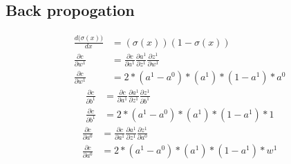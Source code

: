 \documentclass{article}
\begin{document}
\subsection{Back propogation}
\begin{align}
  \frac{d({\sigma(x))}}{dx} &= (\sigma(x))(1 - \sigma(x)) \\
  \frac{\partial{c}}{\partial{w^{1}}} &= \frac{\partial{c}}{\partial{a^{1}}} \frac{\partial{a^{1}}}{\partial{z^{1}}} \frac{\partial{z^{1}}}{\partial{w^{1}}} \\
  \frac{\partial{c}}{\partial{w^{1}}} &= 2 * (a^{1} - a^{0}) * (a^{1}) * (1-a^{1}) * a^{0}
\end{align}
\begin{align}
  \frac{\partial{c}}{\partial{b^{1}}} &= \frac{\partial{c}}{\partial{a^{1}}} \frac{\partial{a^{1}}}{\partial{z^{1}}} \frac{\partial{z^{1}}}{\partial{b^{1}}} \\
  \frac{\partial{c}}{\partial{b^{1}}} &= 2 * (a^{1} - a^{0}) * (a^{1}) * (1-a^{1}) * 1
\end{align}
\begin{align}
  \frac{\partial{c}}{\partial{a^{0}}} &= \frac{\partial{c}}{\partial{a^{1}}} \frac{\partial{a^{1}}}{\partial{z^{1}}} \frac{\partial{z^{1}}}{\partial{a^{0}}} \\
  \frac{\partial{c}}{\partial{a^{0}}} &= 2 * (a^{1} - a^{0}) * (a^{1}) * (1-a^{1}) * w^{1}
\end{align}
\end{document}
